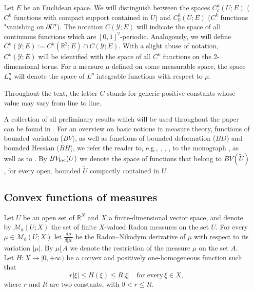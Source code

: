 \documentclass[reqno,10pt]{amsart}
\numberwithin{equation}{section}
\theoremstyle{remark}
\newcommand{\R}{\mathbb{R}}
\newcommand{\U}{U}
\newcommand{\calY}{\mathcal{Y}}
\newcommand{\Mb}{\mathcal{M}_b}
\newcommand{\mres}[1]{\lfloor{#1}}
\begin{document}
Let $E$ be an Euclidean space.
We will distinguish between the spaces $C_c^k(\U;E)$ ($C^k$ functions with compact support contained in $\U$) and $C_0^k(\U;E)$ ($C^k$ functions "vanishing on $\partial{\U}$").
The notation $C(\calY;E)$ will indicate the space of all continuous functions which are $[0,1]^2$-periodic.
Analogously, we will define $C^k(\calY;E) := C^k(\R^2;E) \cap C(\calY;E)$.
With a slight abuse of notation, $C^k(\calY;E)$ will be identified with the space of all $C^k$ functions on the 2-dimensional torus.
For a measure $\mu$ defined on some measurable space, the space $L^p_{\mu}$ will denote the space of $L^p$ integrable functions with respect to $\mu$. 


Throughout the text, the letter $C$ stands for generic positive constants whose value may vary from line to line.

A collection of all preliminary results which will be used throughout the paper can be found in \cite[Section 2]{Buzancic.Davoli.Velcic.2024.1st}.
For an overview on basic notions in measure theory, functions of bounded variation ($BV$), as well as functions of bounded deformation ($BD$) and bounded Hessian ($BH$), we refer the reader to, e.g., \cite{fonseca2007modern}, \cite{ambrosio2000functions}, \cite{braides1998approximation}, to the monograph \cite{Temam.1985}, as well as to \cite{Demengel.1984}.
By $BV_{\rm loc}(U)$ we denote the space of functions that belong to $BV(\widetilde{U})$, for every open, bounded $\widetilde{U}$ compactly contained in $U$.

\subsection{Convex functions of measures} \label{Convex functions of measures}

Let $U$ be an open set of $\R^N$ and $X$ a finite-dimensional vector space, and denote by $\Mb(U;X)$ the set of finite $X$-valued Radon measures on the set $U$.
For every $\mu \in \Mb(U;X)$ let $\frac{d\mu}{d|\mu|}$ be the Radon--Nikodym derivative of $\mu$ with respect to its variation $|\mu|$.
By $\mu\mres{A}$ we denote the restriction of the measure $\mu$ on the set $A$.
Let $H : X \to [0,+\infty)$ be a convex and positively one-homogeneous function such that
\begin{equation} \label{coercivity of H}
	r |\xi| \leq H(\xi) \leq R |\xi| \quad \text{for every}\, \xi \in X,
\end{equation}
where $r$ and $R$ are two constants, with $0 < r \leq R$.
\end{document}
